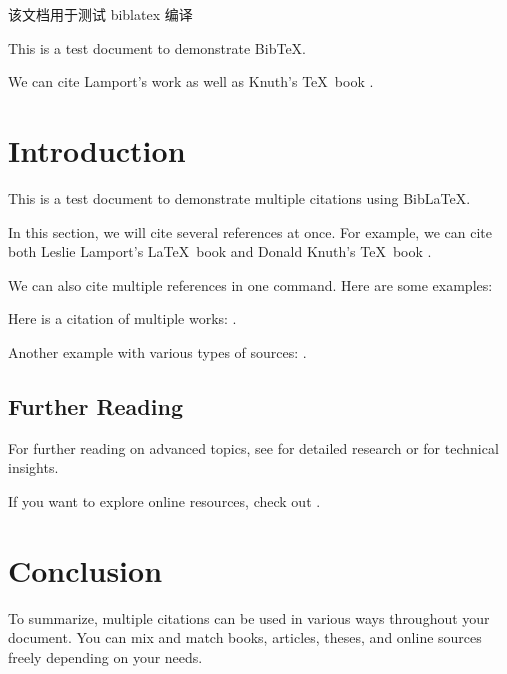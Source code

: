 \documentclass[twoside]{article}
\begin{document}
该文档用于测试 biblatex 编译

This is a test document to demonstrate BibTeX.

We can cite Lamport's work \cite{lamport1986latex} as well as Knuth's \TeX~book \cite{knuth1986texbook}.

\section{Introduction}
This is a test document to demonstrate multiple citations using BibLaTeX.

In this section, we will cite several references at once. For example, we can cite both Leslie Lamport's \LaTeX~book \cite{lamport1986latex} and Donald Knuth's \TeX~book \cite{knuth1986texbook}. 

We can also cite multiple references in one command. Here are some examples:

Here is a citation of multiple works: \cite{lamport1986latex, knuth1986texbook, latexcompanion}.

Another example with various types of sources: \cite{article1, phdthesis1, techreport1, website1}.

\subsection{Further Reading}
For further reading on advanced topics, see \cite{phdthesis1} for detailed research or \cite{techreport1} for technical insights.

If you want to explore online resources, check out \cite{website1}.

\section{Conclusion}
To summarize, multiple citations can be used in various ways throughout your document. You can mix and match books, articles, theses, and online sources freely depending on your needs.
\printbibliography
\end{document}
